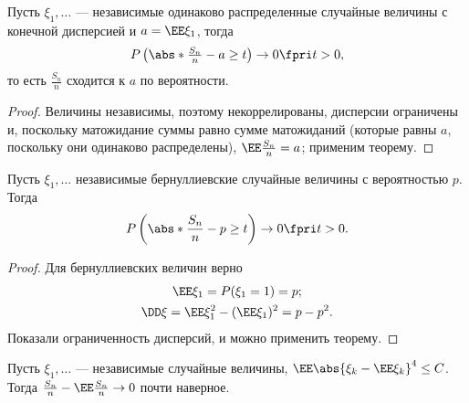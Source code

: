  \begin{corollary} 
 Пусть $\xi_1, \ldots$ --- независимые одинаково распределенные случайные величины с конечной дисперсией и $a = \EE \xi_1$, тогда 
 $$P\left(\abs*{\tfrac{S_n}{n} - a}\ge t\right) \rightarrow 0 \fpri t > 0,$$ 
 то есть $\frac{S_n}{n}$ сходится к $a$ по вероятности.


 \end{corollary}
 \begin{proof}
                   Величины независимы, поэтому некоррелированы, дисперсии ограничены и, поскольку матожидание суммы равно сумме матожиданий (которые равны $a$, поскольку они одинаково распределены), $\EE \frac{S_n}{n} = a$; применим теорему.
               \end{proof} 
 \begin{corollary}
               Пусть $\xi_1, \ldots$ независимые бернуллиевские случайные величины с вероятностью $p$. Тогда 
               $$P\left(\abs*{\frac{S_n}{n} - p}\ge t\right)\rightarrow 0 \fpri t > 0.$$
              
   
 \end{corollary}
               \begin{proof} Для бернуллиевских величин верно
               \begin{gather*}
                   \EE \xi_1 = P(\xi_1 = 1) = p;\\
                   \DD\xi = \EE \xi_1^2 - (\EE \xi_1)^2 = p - p^2.
               \end{gather*}
         Показали ограниченность дисперсий, и можно применить теорему.
     \end{proof}
     
 \begin{theorem}
    Пусть $\xi_1, \ldots$ --- независимые случайные величины, $\EE \abs{\xi_k - \EE \xi_k}^4\le C$.
     Тогда $\frac{S_n}{n} - \EE \frac{S_n}{n} \rightarrow0$ почти наверное.
 \end{theorem}

